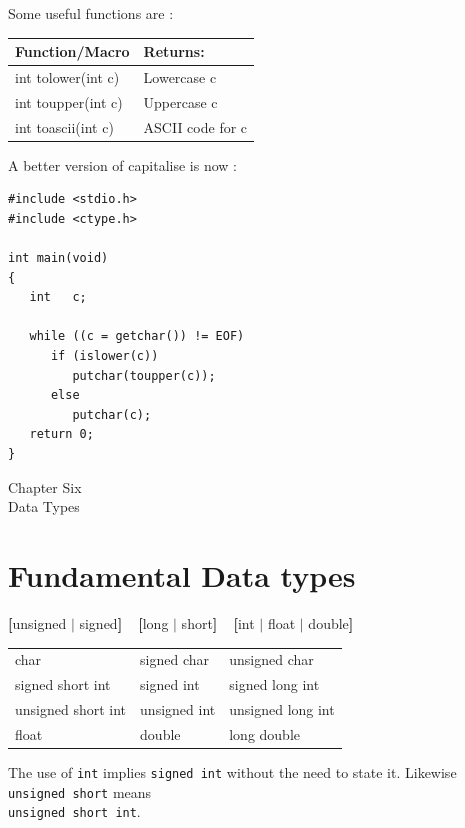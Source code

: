 \documentclass[a4,portraitt]{slides}
\begin{document}
Some useful functions are :

\begin{center}
\begin{tabular}{|l|l|} \hline
Function/Macro & Returns: \\ \hline
int tolower(int c) & Lowercase c \\
int toupper(int c) & Uppercase c \\
int toascii(int c) & ASCII code for c \\ \hline
\end{tabular}
\end{center}

\newpage
A better version of capitalise is now :

\begin{verbatim}
#include <stdio.h>
#include <ctype.h>

int main(void)
{
   int   c;

   while ((c = getchar()) != EOF)
      if (islower(c))
         putchar(toupper(c));
      else
         putchar(c);
   return 0;
}
\end{verbatim}

\newpage
\begin{center}
{\Large Chapter Six \\ Data Types}
\end{center}

\section*{Fundamental Data types}

{\bf [}unsigned $|$ signed{\bf ]\ \ [}long $|$ short{\bf ]\ \ [}int $|$ float $|$ double{\bf ]}

{\small
\begin{center}
\begin{tabular}{|lll|} \hline
char            & signed char       & unsigned char \\
signed short int    & signed int        & signed long int \\
unsigned short int  & unsigned int      & unsigned long int \\
float           & double        & long double \\
\hline
\end{tabular}
\end{center}
}

The use of {\tt int} implies {\tt signed int} without the need
to state it. Likewise {\tt unsigned short} means\\ {\tt unsigned short
int}.
\end{document}
